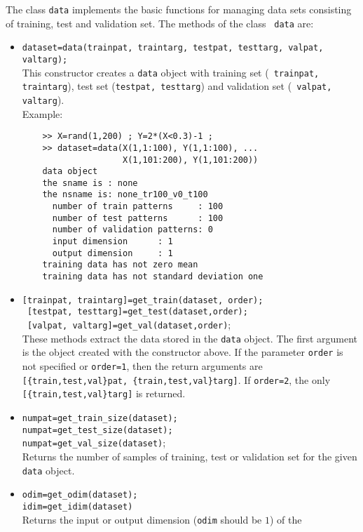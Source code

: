 \documentclass{article}
\begin{document}
The class {\tt data} implements the basic functions for managing data sets
consisting of training, test and validation set. The methods of the class {\tt
  data} are:
\begin{itemize}
\item {\tt dataset=data(trainpat, traintarg, testpat, testtarg, valpat,
    valtarg);}\\
  This constructor creates a {\tt data} object with training set ({\tt
    trainpat, traintarg}), test set ({\tt testpat, testtarg}) and validation
  set ({\tt
    valpat, valtarg}).\\
  Example:
  \begin{verbatim}
    >> X=rand(1,200) ; Y=2*(X<0.3)-1 ;
    >> dataset=data(X(1,1:100), Y(1,1:100), ...
                    X(1,101:200), Y(1,101:200))
    data object
    the sname is : none
    the nsname is: none_tr100_v0_t100
      number of train patterns     : 100
      number of test patterns      : 100
      number of validation patterns: 0
      input dimension      : 1
      output dimension     : 1
    training data has not zero mean
    training data has not standard deviation one
  \end{verbatim}
\vspace*{-5mm}
\item {\tt [trainpat, traintarg]=get\_train(dataset, order);\\
    \ [testpat, testtarg]=get\_test(dataset,order);\\
    \ [valpat, valtarg]=get\_val(dataset,order)};\\
  These methods extract the data stored in the {\tt data} object. The first
  argument is the object created with the constructor above. If the parameter
  {\tt order} is not specified or {\tt order=1}, then the return arguments
  are {\tt [\{train,test,val\}pat, \{train,test,val\}targ]}. If {\tt order=2},
  the only {\tt [\{train,test,val\}targ]} is returned.
\item {\tt numpat=get\_train\_size(dataset);\\
    numpat=get\_test\_size(dataset);\\
    numpat=get\_val\_size(dataset)};\\
  Returns the number of samples of training, test or validation set for the
  given {\tt data} object.
\item {\tt odim=get\_odim(dataset);\\
    idim=get\_idim(dataset)}\\
  Returns the input or output dimension ({\tt odim} should be $1$) of the

\end{itemize}
\end{document}
